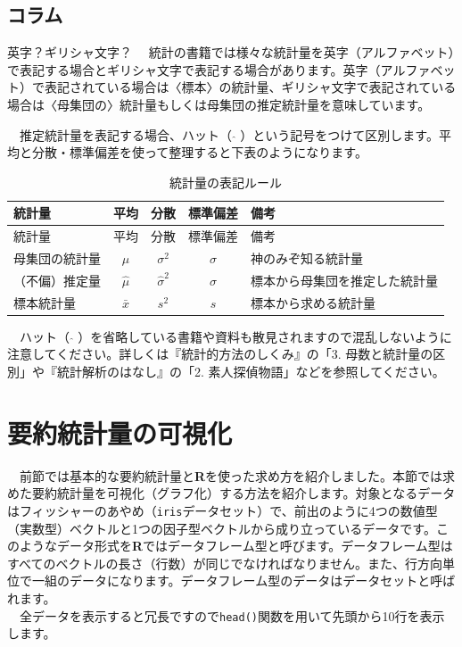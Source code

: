 \documentclass[
  12pt,
]{book}
\begin{document}
\hypertarget{ux30b3ux30e9ux30e0-1}{%
\subsection*{コラム}\label{ux30b3ux30e9ux30e0-1}}

\begin{info-box}{英字？ギリシャ文字？}
　統計の書籍では様々な統計量を英字（アルファベット）で表記する場合とギリシャ文字で表記する場合があります。英字（アルファベット）で表記されている場合は〈標本〉の統計量、ギリシャ文字で表記されている場合は〈母集団の〉統計量もしくは母集団の推定統計量を意味しています。

　推定統計量を表記する場合、ハット（ \(\hat{}\) ）という記号をつけて区別します。平均と分散・標準偏差を使って整理すると下表のようになります。

\begin{longtable}[]{@{}lcccl@{}}
\caption{統計量の表記ルール}\tabularnewline
\toprule
統計量 & 平均 & 分散 & 標準偏差 & 備考 \\
\midrule
\endfirsthead
\toprule
統計量 & 平均 & 分散 & 標準偏差 & 備考 \\
\midrule
\endhead
母集団の統計量 & \(\mu\) & \(\sigma^2\) & \(\sigma\) & 神のみぞ知る統計量 \\
（不偏）推定量 & \(\hat{\mu}\) & \(\hat{\sigma}^2\) & \(\hat{\sigma}\) & 標本から母集団を推定した統計量 \\
標本統計量 & \(\bar{x}\) & \(s^2\) & \(s\) & 標本から求める統計量 \\
\bottomrule
\end{longtable}

　ハット（ \(\hat{}\) ）を省略している書籍や資料も散見されますので混乱しないように注意してください。詳しくは『統計的方法のしくみ』\citep{ToukeitekiHouhounoSikumi:jbook}の「3. 母数と統計量の区別」や『統計解析のはなし』\citep{ToukeiKaisekinoHanashi}の「2. 素人探偵物語」などを参照してください。

\end{info-box}

\newpage

\hypertarget{ux8981ux7d04ux7d71ux8a08ux91cfux306eux53efux8996ux5316}{%
\section{要約統計量の可視化}\label{ux8981ux7d04ux7d71ux8a08ux91cfux306eux53efux8996ux5316}}

　前節では基本的な要約統計量と\textbf{R}を使った求め方を紹介しました。本節では求めた要約統計量を可視化（グラフ化）する方法を紹介します。対象となるデータはフィッシャーのあやめ（\texttt{iris}データセット）で、前出のように4つの数値型（実数型）ベクトルと1つの因子型ベクトルから成り立っているデータです。このようなデータ形式を\textbf{R}ではデータフレーム型と呼びます。データフレーム型はすべてのベクトルの長さ（行数）が同じでなければなりません。また、行方向単位で一組のデータになります。データフレーム型のデータはデータセットと呼ばれます。\\
　全データを表示すると冗長ですので\texttt{head()}関数を用いて先頭から10行を表示します。
\end{document}
